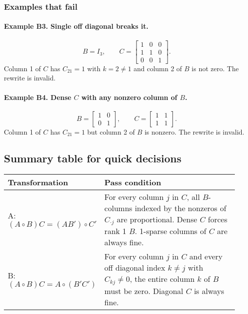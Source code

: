 \documentclass[11pt,a4paper]{article}
\theoremstyle{definition}
\newcommand{\Had}{\circ}
\begin{document}
\subsubsection*{Examples that fail}
\paragraph{Example B3. Single off diagonal breaks it.}
\[
B=I_3,\qquad
C=\begin{bmatrix}
1&0&0\\
1&1&0\\
0&0&1
\end{bmatrix}.
\]
Column 1 of $C$ has $C_{21}=1$ with $k=2\ne 1$ and column 2 of $B$ is not zero. The rewrite is invalid.

\paragraph{Example B4. Dense $C$ with any nonzero column of $B$.}
\[
B=\begin{bmatrix}
1&0\\
0&1
\end{bmatrix},
\qquad
C=\begin{bmatrix}
1&1\\
1&1
\end{bmatrix}.
\]
Column 1 of $C$ has $C_{21}=1$ but column 2 of $B$ is nonzero. The rewrite is invalid.

\bigskip
\subsection{Summary table for quick decisions}
\label{subsec:summary-table}

\begin{center}
\renewcommand{\arraystretch}{1.2}
\begin{tabular}{@{}p{0.24\linewidth}p{0.70\linewidth}@{}}
\toprule
\textbf{Transformation} & \textbf{Pass condition} \\
\midrule
A: $(A \Had B)C=(AB')\Had C'$ &
For every column $j$ in $C$, all $B$-columns indexed by the nonzeros of $C_{\cdot j}$ are proportional. Dense $C$ forces rank 1 $B$. 1-sparse columns of $C$ are always fine. \\
\addlinespace
B: $(A \Had B)C=A \Had (B' C')$ &
For every column $j$ in $C$ and every off diagonal index $k\ne j$ with $C_{k j}\ne 0$, the entire column $k$ of $B$ must be zero. Diagonal $C$ is always fine. \\
\bottomrule
\end{tabular}
\end{center}
\clearpage
\end{document}
